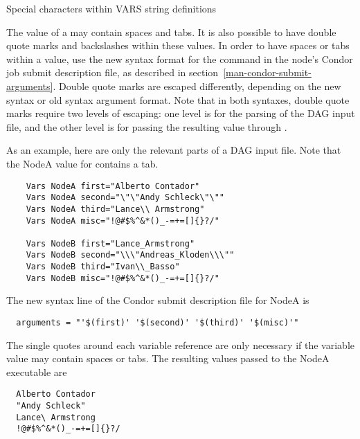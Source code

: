 \begin{description}
\item[Special characters within VARS string definitions]
\end{description}

The value of a   may contain spaces and tabs.
It is also possible to have double quote marks and
backslashes within these values.
In order to have spaces or tabs within a value,
use the new syntax format for the  command
in the node's Condor job submit description file,
as described in section~\ref{man-condor-submit-arguments}.
Double quote marks are escaped differently,
depending on the new syntax or old syntax argument format.
Note that in both syntaxes,
double quote marks require two levels of escaping:
one level is for the parsing of the DAG input file, and the other level is for
passing the resulting value through .

As an example, here are only the relevant parts of a DAG input file.
Note that the NodeA value for  contains a tab.
\footnotesize
\begin{verbatim}
    Vars NodeA first="Alberto Contador"
    Vars NodeA second="\"\"Andy	Schleck\"\""
    Vars NodeA third="Lance\\ Armstrong"
    Vars NodeA misc="!@#$%^&*()_-=+=[]{}?/"
    
    Vars NodeB first="Lance_Armstrong"
    Vars NodeB second="\\\"Andreas_Kloden\\\""
    Vars NodeB third="Ivan\\_Basso"
    Vars NodeB misc="!@#$%^&*()_-=+=[]{}?/"
\end{verbatim}
\normalsize

The new syntax  line of the Condor submit description file
for NodeA is
\footnotesize
\begin{verbatim}
  arguments = "'$(first)' '$(second)' '$(third)' '$(misc)'"
\end{verbatim}
\normalsize
The single quotes around each variable reference are only necessary
if the variable value may contain spaces or tabs.
The resulting values passed to the NodeA executable are
\footnotesize
\begin{verbatim}
  Alberto Contador
  "Andy	Schleck"
  Lance\ Armstrong
  !@#$%^&*()_-=+=[]{}?/
\end{verbatim}
\normalsize

